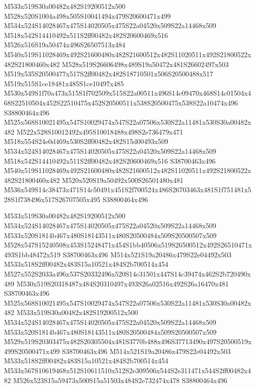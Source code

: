 \documentclass{article}
\begin{document}
\begin{multicols}{2}
M533x519S30a00482x482S19200512x500 M528x520S1004a498x505S10041494x479S20600471x499 M534x524S14028467x475S14020505x475S22a04520x509S22a14468x509 M518x542S14410492x511S2ff00482x482S20600469x516 M526x516S19a50474x496S26507513x484 M540x519S11028469x492S21600480x482S21600512x482S11020511x492S21800522x482S21800460x482 M528x519S26606498x489S19a50472x481S26602497x503 M519x535S20500477x517S2ff00482x482S18710501x506S20500488x517 M519x515S1ce18481x485S1ce10497x485 M530x549S1f70a473x515S1f702509x515S22a00511x496S14c09470x468S14c01504x468S22510504x452S22510475x452S20500511x538S20500475x538S22a10474x496 S38800464x496 M525x568S10021495x547S10029474x547S22a07506x530S22a11481x530S30a00482x482 M522x528S10012492x495S10018488x498S2e736479x471 M518x554S24e0d469x530S2ff00482x482S15d00493x509 M534x524S14028467x475S14020505x475S22a04520x509S22a14468x509 M518x542S14410492x511S2ff00482x482S20600469x516 S38700463x496 M540x519S11028469x492S21600480x482S21600512x482S11020511x492S21800522x482S21800460x482 M520x520S19a50492x500S26501480x481 M536x549S14c38473x471S14c50491x451S2f700524x486S26703463x481S1f751481x528S1f738496x517S26707505x495 S38800464x496

M533x519S30a00482x482S19200512x500 M534x524S14028467x475S14020505x475S22a04520x509S22a14468x509 M533x520S1814b467x480S18143511x480S20500484x509S20500507x509 M528x547S15240508x453S15248471x454S1bb40506x519S26500512x492S26510471x493S1bb48472x519 S38700463x496 M514x521S19a20486x479S22e04492x503 M533x518S2ff00482x483S15a10521x484S2b700514x454 M527x552S2033a496x537S20332496x520S14c31501x447S14c39474x462S2b720490x489 M530x519S20318487x484S20310497x493S26a02516x492S26a16470x481 S38700463x496 M525x568S10021495x547S10029474x547S22a07506x530S22a11481x530S30a00482x482 M533x519S30a00482x482S19200512x500 M534x524S14028467x475S14020505x475S22a04520x509S22a14468x509 M533x520S1814b467x480S18143511x480S20500484x509S20500507x509 M529x519S20303475x482S20305504x481S3770b488x496S37713490x497S20500519x499S20500471x499 S38700463x496 M514x521S19a20486x479S22e04492x503 M533x518S2ff00482x483S15a10521x484S2b700514x454 M533x567S10619468x512S10611510x512S2e309506x544S2e311471x544S2ff00482x482 M526x523S15a59473x500S15a51503x484S2e732474x478 S38800464x496


\end{multicols}
\end{document}
